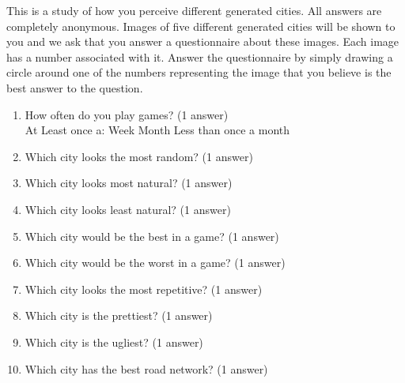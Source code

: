 			 \label{ssssec:questionnaire}
			This is a study of how you perceive different generated cities.
			All answers are completely anonymous.
			Images of five different generated cities will be shown
			to you and we ask that you answer a questionnaire about these images.
			Each image has a number associated with it.
			Answer the questionnaire by simply drawing a circle
			around one of the numbers representing the image that you believe is the best
			answer to the question.
			
			\begin{enumerate}
				\item How often do you play games? (1 answer)\\
				At Least once a:	\tab Week \tab Month \tab Less than once a month
				
				\item Which city looks the most random? (1 answer)\\
				    
				
				\item Which city looks most natural? (1 answer)\\
				    
				
				\item Which city looks least natural? (1 answer)\\
				    
				
				\item Which city would be the best in a game? (1 answer)\\
				    
				
				\item Which city would be the worst in a game? (1 answer)\\
				    
				
				\item Which city looks the most repetitive? (1 answer)\\
				    
				
				\item Which city is the prettiest? (1 answer)\\
				    
				
				\item Which city is the ugliest? (1 answer)\\
				    
				
				\item Which city has the best road network? (1 answer)\\
				    
			\end{enumerate}
		
